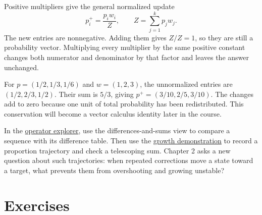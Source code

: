 \documentclass[11pt,oneside,openany]{book}
\theoremstyle{definition}
\theoremstyle{remark}
\numberwithin{equation}{chapter}
\begin{document}
Positive multipliers give the general normalized update \[p_i^+=\frac{p_iw_i}{Z},\qquad Z=\sum_{j=1}^k p_jw_j.\] The new entries are nonnegative. Adding them gives \(Z/Z=1\), so they are still a probability vector. Multiplying every multiplier by the same positive constant changes both numerator and denominator by that factor and leaves the answer unchanged.

For \(p=(1/2,1/3,1/6)\) and \(w=(1,2,3)\), the unnormalized entries are \((1/2,2/3,1/2)\). Their sum is \(5/3\), giving \(p^+=(3/10,2/5,3/10)\). The changes add to zero because one unit of total probability has been redistributed. This conservation will become a vector calculus identity later in the course.

In the \href{https://bobovski66.github.io/IntroDiscreteInfoGeom/demos/operator-explorer.html}{operator explorer}, use the differences-and-sums view to compare a sequence with its difference table. Then use the \href{https://bobovski66.github.io/IntroDiscreteInfoGeom/demos/week01.html}{growth demonstration} to record a proportion trajectory and check a telescoping sum. Chapter 2 asks a new question about such trajectories: when repeated corrections move a state toward a target, what prevents them from overshooting and growing unstable?

\section{Exercises}\label{ch01-exercises}
\end{document}
